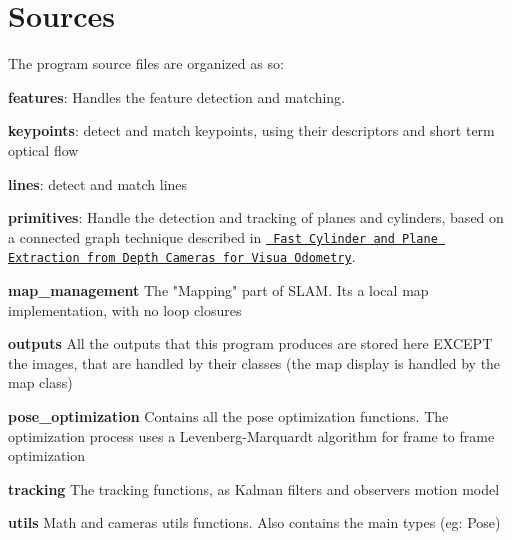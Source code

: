 \chapter{Sources}
\hypertarget{md__2home_2baptisteh_2_documents_2code_2robots_2_r_g_b___s_l_a_m_2_r_g_b-_d-_s_l_a_m_2src_2_r_e_a_d_m_e}{}\label{md__2home_2baptisteh_2_documents_2code_2robots_2_r_g_b___s_l_a_m_2_r_g_b-_d-_s_l_a_m_2src_2_r_e_a_d_m_e}
\label{md__2home_2baptisteh_2_documents_2code_2robots_2_r_g_b___s_l_a_m_2_r_g_b-_d-_s_l_a_m_2src_2_r_e_a_d_m_e_autotoc_md0}%
%
 The program source files are organized as so\+:
\begin{DoxyItemize}
\item {\bfseries{features}}\+: Handles the feature detection and matching.
\begin{DoxyItemize}
\item {\bfseries{keypoints}}\+: detect and match keypoints, using their descriptors and short term optical flow
\item {\bfseries{lines}}\+: detect and match lines
\item {\bfseries{primitives}}\+: Handle the detection and tracking of planes and cylinders, based on a connected graph technique described in \href{https://arxiv.org/pdf/1803.02380.pdf}{\texttt{ Fast Cylinder and Plane Extraction from Depth Cameras for Visua Odometry}}.
\end{DoxyItemize}
\item {\bfseries{map\+\_\+management}} The "{}\+Mapping"{} part of SLAM. It\textquotesingle{}s a local map implementation, with no loop closures
\item {\bfseries{outputs}} All the outputs that this program produces are stored here EXCEPT the images, that are handled by their classes (the map display is handled by the map class)
\item {\bfseries{pose\+\_\+optimization}} Contains all the pose optimization functions. The optimization process uses a Levenberg-\/\+Marquardt algorithm for frame to frame optimization
\item {\bfseries{tracking}} The tracking functions, as Kalman filters and observers motion model
\item {\bfseries{utils}} Math and cameras utils functions. Also contains the main types (eg\+: Pose) 
\end{DoxyItemize}